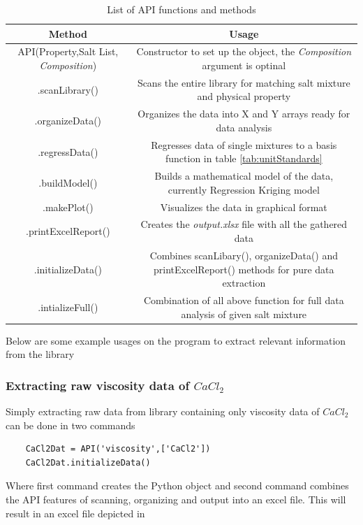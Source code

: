 \begin{table}[h]
    \centering
    \caption{List of API functions and methods}
    \begin{adjustbox}{width=1\textwidth}
    \begin{tabular}{c|c}
    \hline
    Method    & Usage  \\ \hline
    API(Property,Salt List, \textit{Composition}) & Constructor to set up the object, the \textit{Composition} argument is optinal \\
    .scanLibrary() & Scans the entire library for matching salt mixture and physical property \\
    .organizeData() & Organizes the data into X and Y arrays ready for data analysis \\
    .regressData() & Regresses data of single mixtures to a basis function in table \ref{tab:unitStandards}\\
    .buildModel() & Builds a mathematical model of the data, currently Regression Kriging model \\
    .makePlot() & Visualizes the data in graphical format \\
    .printExcelReport() & Creates the \textit{output.xlsx} file with all the gathered data \\
    .initializeData() & Combines scanLibary(), organizeData() and printExcelReport() methods for pure data extraction\\
    .intializeFull() & Combination of all above function for full data analysis of given salt mixture \\
    \hline
    \end{tabular}
    \end{adjustbox}
    \label{tab:apiMethods}
\end{table}

Below are some example usages on the program to extract relevant information from the library

\subsubsection{Extracting raw viscosity data of $CaCl_2$}
Simply extracting raw data from library containing only viscosity data of $CaCl_2$ can be done in two commands
\begin{verbatim}
    CaCl2Dat = API('viscosity',['CaCl2'])
    CaCl2Dat.initializeData()
\end{verbatim}
Where first command creates the Python object and second command combines the API features of scanning, organizing and output into an excel file. This will result in an excel file depicted in

